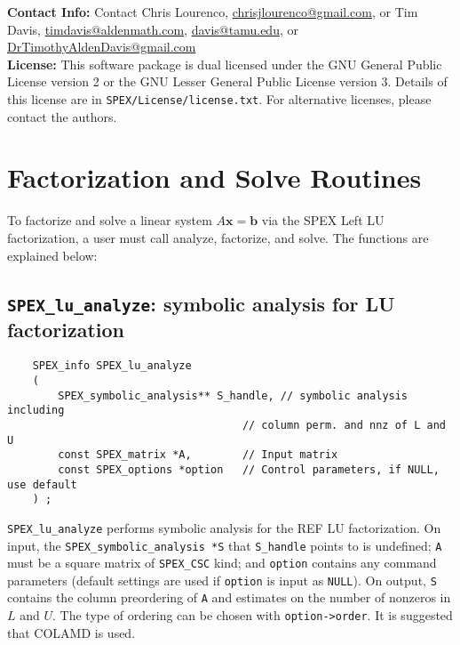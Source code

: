 \documentclass[12pt,oneside]{book}
\theoremstyle{definition}
\begin{document}
\noindent \textbf{Contact Info:} Contact Chris Lourenco,
\href{mailto:chrisjlourenco@gmail.com}{chrisjlourenco@gmail.com}, or Tim Davis,
\href{mailto:timdavis@aldenmath.com}{timdavis@aldenmath.com},
\href{mailto:davis@tamu.edu}{davis@tamu.edu}, or
\href{DrTimothyAldenDavis@gmail.com}{DrTimothyAldenDavis@gmail.com}\\

\noindent \textbf{License:} This software package is dual licensed under the GNU General Public License version 2 or the GNU Lesser General Public License version 3. Details of this license are in \verb|SPEX/License/license.txt|. For alternative licenses, please contact the authors.


\section{Factorization and Solve Routines}

To factorize and solve a linear system $A \mathbf{x} = \mathbf{b}$ via the SPEX Left LU factorization, a user must call analyze, factorize, and solve. The functions are explained below:

\subsection{\texttt{SPEX\_lu\_analyze}: symbolic analysis for LU factorization} \label{ss:spex_lu_analyze}
\begin{mdframed}[userdefinedwidth=\textwidth]
{\footnotesize
\begin{verbatim}
    SPEX_info SPEX_lu_analyze
    (
        SPEX_symbolic_analysis** S_handle, // symbolic analysis including
                                     // column perm. and nnz of L and U
        const SPEX_matrix *A,        // Input matrix
        const SPEX_options *option   // Control parameters, if NULL, use default
    ) ;
\end{verbatim}
} \end{mdframed}

\verb|SPEX_lu_analyze| performs symbolic analysis for the REF LU factorization. On input, the \verb|SPEX_symbolic_analysis *S| that \verb|S_handle| points to is undefined; \verb|A| must be a square matrix of \verb|SPEX_CSC| kind; and \verb|option| contains any command parameters  (default settings are used if
\verb|option| is input as \verb|NULL|). On output, \verb|S| contains the column preordering of \verb|A| and estimates on the number of nonzeros in $L$ and $U$. The type of ordering can be chosen with \verb|option->order|. It is suggested that COLAMD is used.
\end{document}
